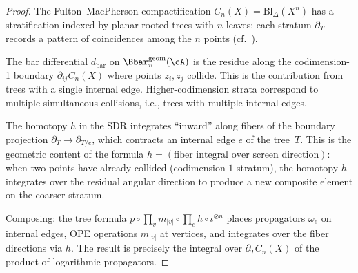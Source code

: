 \begin{proof}
The Fulton--MacPherson compactification
$\overline{C}_n(X) = \mathrm{Bl}_{\Delta}(X^n)$ has a stratification
indexed by planar rooted trees with $n$ leaves: each stratum
$\partial_T$ records a pattern of coincidences among the $n$ points
(cf.\ \cite{FM94}).

The bar differential $d_{\mathrm{bar}}$ on
$\Bbar^{\mathrm{geom}}_n(\cA)$ is the residue along the codimension-1
boundary $\partial_{ij}\overline{C}_n(X)$ where points $z_i, z_j$
collide. This is the contribution from trees with a single
internal edge. Higher-codimension strata correspond to multiple
simultaneous collisions, i.e., trees with multiple internal edges.

The homotopy $h$ in the SDR integrates ``inward'' along fibers of the
boundary projection $\partial_T \to \partial_{T/e}$, which contracts
an internal edge $e$ of the tree~$T$. This is the geometric
content of the formula $h = (\text{fiber integral over screen
direction})$: when two points have already collided (codimension-$1$
stratum), the homotopy $h$ integrates over the residual angular
direction to produce a new composite element on the coarser stratum.

Composing: the tree formula $p \circ \prod_v m_{|v|} \circ
\prod_e h \circ \iota^{\otimes n}$ places propagators $\omega_e$
on internal edges, OPE operations $m_{|v|}$ at vertices, and
integrates over the fiber directions via $h$. The result is
precisely the integral over $\partial_T\overline{C}_n(X)$ of the
product of logarithmic propagators.
\end{proof}

